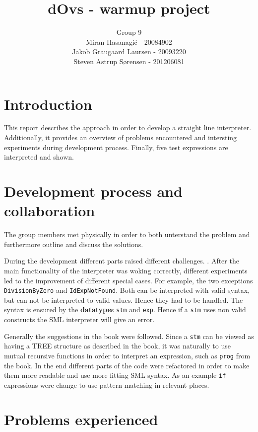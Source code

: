 \documentclass[a4paper]{article}
\title{dOvs - warmup project}
\author{
  Group 9 \\
  Miran Hasanagi\'{c} - 20084902 \\
  Jakob Graugaard Laursen - 20093220\\
  Steven Astrup S\o rensen - 201206081
}
\begin{document}
\maketitle

\section{Introduction}

This report describes the approach in order to develop a straight line interpreter. Additionally, it provides an overview of problems encountered and intersting experiments during development process. Finally, five test expressions are interpreted and shown.


\section{Development process and collaboration}
The group members met physically in order to both unterstand the problem and furthermore outline and discuss the solutions.

During the development different parts raised different challenges. . After the main functionality of the interpreter was woking correctly, different experiments led to the improvement of different special cases. For example, the two exceptions \texttt{DivisionByZero} and \texttt{IdExpNotFound}. Both can be interpreted with valid syntax, but can not be interpreted to valid values. Hence they had to be handled. The syntax is ensured by the \textbf{datatype}s \texttt{stm} and \texttt{exp}. Hence if a \texttt{stm} uses non valid constructs the SML interpreter will give an error.

Generally the suggestions in the book were followed. Since a \texttt{stm} can be viewed as having a TREE structure as described in the book, it was naturally to use mutual recursive functions in order to interpret an expression, such as \texttt{prog} from the book. In the end different parts of the code were refactored in order to make them more readable and use more fitting SML syntax. As an example \texttt{if} expressions were change to use pattern matching in relevant places. 

\section{Problems experienced}
\end{document}
